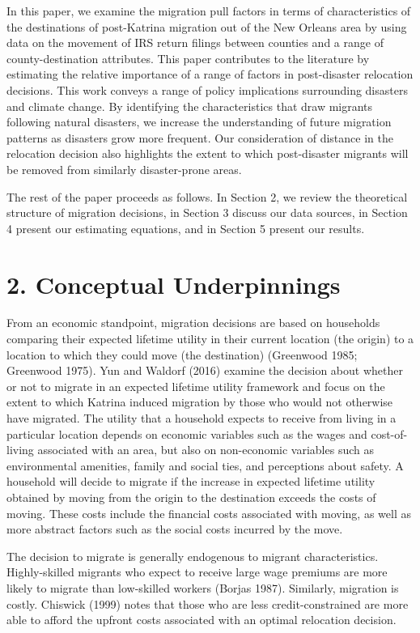 \documentclass[]{article}
\begin{document}
In this paper, we examine the migration pull factors in terms of
characteristics of the destinations of post-Katrina migration out of the
New Orleans area by using data on the movement of IRS return filings
between counties and a range of county-destination attributes. This
paper contributes to the literature by estimating the relative
importance of a range of factors in post-disaster relocation decisions.
This work conveys a range of policy implications surrounding disasters
and climate change. By identifying the characteristics that draw
migrants following natural disasters, we increase the understanding of
future migration patterns as disasters grow more frequent. Our
consideration of distance in the relocation decision also highlights the
extent to which post-disaster migrants will be removed from similarly
disaster-prone areas.

The rest of the paper proceeds as follows. In Section 2, we review the
theoretical structure of migration decisions, in Section 3 discuss our
data sources, in Section 4 present our estimating equations, and in
Section 5 present our results.

\section{2. Conceptual Underpinnings}\label{conceptual-underpinnings}

From an economic standpoint, migration decisions are based on households
comparing their expected lifetime utility in their current location (the
origin) to a location to which they could move (the destination)
(Greenwood 1985; Greenwood 1975). Yun and Waldorf (2016) examine the
decision about whether or not to migrate in an expected lifetime utility
framework and focus on the extent to which Katrina induced migration by
those who would not otherwise have migrated. The utility that a
household expects to receive from living in a particular location
depends on economic variables such as the wages and cost-of-living
associated with an area, but also on non-economic variables such as
environmental amenities, family and social ties, and perceptions about
safety. A household will decide to migrate if the increase in expected
lifetime utility obtained by moving from the origin to the destination
exceeds the costs of moving. These costs include the financial costs
associated with moving, as well as more abstract factors such as the
social costs incurred by the move.

The decision to migrate is generally endogenous to migrant
characteristics. Highly-skilled migrants who expect to receive large
wage premiums are more likely to migrate than low-skilled workers
(Borjas 1987). Similarly, migration is costly. Chiswick (1999) notes
that those who are less credit-constrained are more able to afford the
upfront costs associated with an optimal relocation decision.
\end{document}
